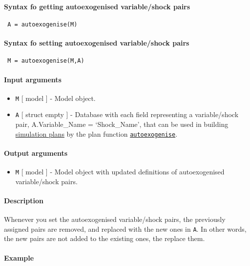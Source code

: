 


	\paragraph{Syntax fo getting autoexogenised variable/shock pairs}
 
 \begin{verbatim}
 A = autoexogenise(M)
 \end{verbatim}
 
 \paragraph{Syntax fo setting autoexogenised variable/shock pairs}
 
 \begin{verbatim}
 M = autoexogenise(M,A)
 \end{verbatim}
 
 \paragraph{Input arguments}
 
 \begin{itemize}
 \item
   \texttt{M} {[} model {]} - Model object.
 \item
   \texttt{A} {[} struct \textbar{} empty {]} - Database with each field
   representing a variable/shock pair, A.Variable\_Name = `Shock\_Name',
   that can be used in building \href{plan/Contents}{simulation plans} by
   the plan function \href{plan/autoexogenise}{\texttt{autoexogenise}}.
 \end{itemize}
 
 \paragraph{Output arguments}
 
 \begin{itemize}
 \item
   \texttt{M} {[} model {]} - Model object with updated definitions of
   autoexogenised variable/shock pairs.
 \end{itemize}
 
 \paragraph{Description}
 
 Whenever you set the autoexogenised variable/shock pairs, the previously
 assigned pairs are removed, and replaced with the new ones in
 \texttt{A}. In other words, the new pairs are not added to the existing
 ones, the replace them.
 
 \paragraph{Example}


